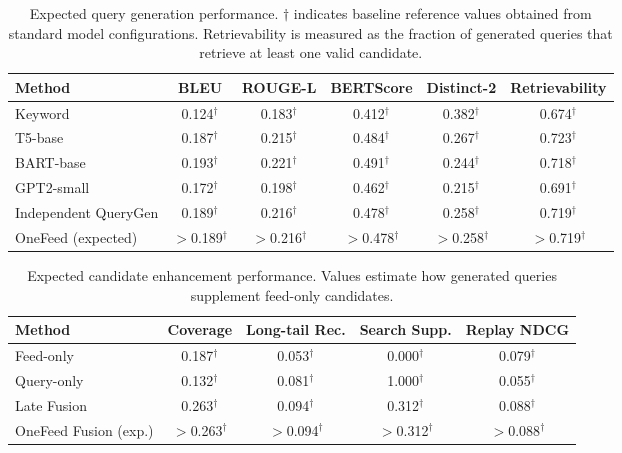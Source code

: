 \documentclass[11pt]{article}
\begin{document}
\begin{table}[t]
\centering
\caption{Expected query generation performance. $\dagger$ indicates baseline reference values obtained from standard model configurations. Retrievability is measured as the fraction of generated queries that retrieve at least one valid candidate.}
\label{tab:query_generation}
\begin{tabular}{lccccc}
\toprule
Method & BLEU & ROUGE-L & BERTScore & Distinct-2 & Retrievability \\
\midrule
Keyword & 0.124$^\dagger$ & 0.183$^\dagger$ & 0.412$^\dagger$ & 0.382$^\dagger$ & 0.674$^\dagger$ \\
T5-base & 0.187$^\dagger$ & 0.215$^\dagger$ & 0.484$^\dagger$ & 0.267$^\dagger$ & 0.723$^\dagger$ \\
BART-base & 0.193$^\dagger$ & 0.221$^\dagger$ & 0.491$^\dagger$ & 0.244$^\dagger$ & 0.718$^\dagger$ \\
GPT2-small & 0.172$^\dagger$ & 0.198$^\dagger$ & 0.462$^\dagger$ & 0.215$^\dagger$ & 0.691$^\dagger$ \\
Independent QueryGen & 0.189$^\dagger$ & 0.216$^\dagger$ & 0.478$^\dagger$ & 0.258$^\dagger$ & 0.719$^\dagger$ \\
OneFeed (expected) & $>$0.189$^\dagger$ & $>$0.216$^\dagger$ & $>$0.478$^\dagger$ & $>$0.258$^\dagger$ & $>$0.719$^\dagger$ \\
\bottomrule
\end{tabular}
\end{table}

\begin{table}[t]
\centering
\caption{Expected candidate enhancement performance. Values estimate how generated queries supplement feed-only candidates.}
\label{tab:enhancement}
\small
\begin{tabular}{lcccc}
\toprule
Method & Coverage & Long-tail Rec. & Search Supp. & Replay NDCG \\
\midrule
Feed-only & 0.187$^\dagger$ & 0.053$^\dagger$ & 0.000$^\dagger$ & 0.079$^\dagger$ \\
Query-only & 0.132$^\dagger$ & 0.081$^\dagger$ & 1.000$^\dagger$ & 0.055$^\dagger$ \\
Late Fusion & 0.263$^\dagger$ & 0.094$^\dagger$ & 0.312$^\dagger$ & 0.088$^\dagger$ \\
OneFeed Fusion (exp.) & $>$0.263$^\dagger$ & $>$0.094$^\dagger$ & $>$0.312$^\dagger$ & $>$0.088$^\dagger$ \\
\bottomrule
\end{tabular}
\end{table}
\end{document}
